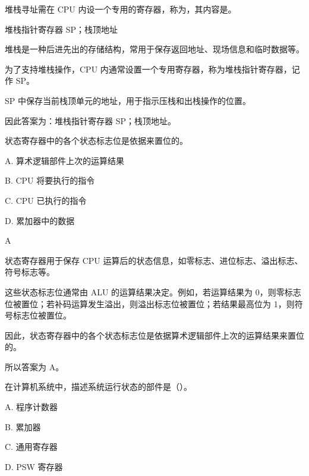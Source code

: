 \begin{question}
堆栈寻址需在 CPU 内设一个专用的寄存器，称为\underline{\hspace{3cm}}，其内容是\underline{\hspace{3cm}}。
\end{question}

\begin{answer}
堆栈指针寄存器 SP；栈顶地址
\end{answer}

\begin{analysisenv}
堆栈是一种后进先出的存储结构，常用于保存返回地址、现场信息和临时数据等。

为了支持堆栈操作，CPU 内通常设置一个专用寄存器，称为堆栈指针寄存器，记作 SP。

SP 中保存当前栈顶单元的地址，用于指示压栈和出栈操作的位置。

因此答案为：堆栈指针寄存器 SP；栈顶地址。
\end{analysisenv}



\begin{question}
状态寄存器中的各个状态标志位是依据\underline{\hspace{3cm}}来置位的。

A. 算术逻辑部件上次的运算结果

B. CPU 将要执行的指令

C. CPU 已执行的指令

D. 累加器中的数据
\end{question}

\begin{answer}
A
\end{answer}

\begin{analysisenv}
状态寄存器用于保存 CPU 运算后的状态信息，如零标志、进位标志、溢出标志、符号标志等。

这些状态标志位通常由 ALU 的运算结果决定。例如，若运算结果为 0，则零标志位被置位；若补码运算发生溢出，则溢出标志位被置位；若结果最高位为 1，则符号标志位被置位。

因此，状态寄存器中的各个状态标志位是依据算术逻辑部件上次的运算结果来置位的。

所以答案为 A。
\end{analysisenv}


\begin{question}
在计算机系统中，描述系统运行状态的部件是（）。

A. 程序计数器

B. 累加器

C. 通用寄存器

D. PSW 寄存器
\end{question}

